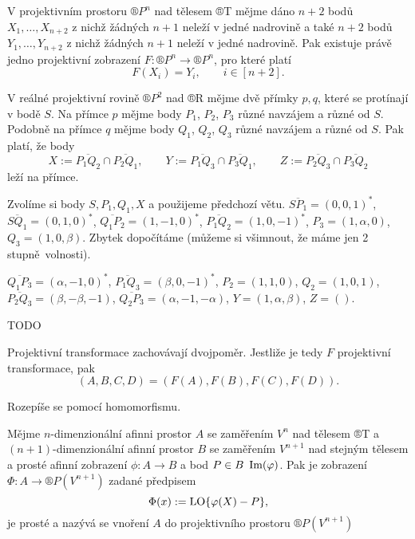 \documentclass[12pt]{article}					%
\begin{document}
\begin{dusledek}
	V projektivním prostoru $®P^n$ nad tělesem ®T mějme dáno $n+2$ bodů $X_1, …, X_{n+2}$ z nichž žádných $n+1$ neleží v jedné nadrovině a také $n+2$ bodů $Y_1, …, Y_{n+2}$ z nichž žádných $n+1$ neleží v jedné nadrovině. Pak existuje právě jedno projektivní zobrazení $F: ®P^n \rightarrow ®P^n$, pro které platí
	$$ F(X_i) = Y_i, \qquad i \in [n+2]. $$
\end{dusledek}

\begin{veta}
	V reálné projektivní rovině $®P^2$ nad ®R mějme dvě přímky $p, q$, které se protínají v bodě $S$. Na přímce $p$ mějme body $P_1$, $P_2$, $P_3$ různé navzájem a různé od $S$. Podobně na přímce $q$ mějme body $Q_1$, $Q_2$, $Q_3$ různé navzájem a různé od $S$. Pak platí, že body
	$$ X := \overline{P_1Q_2} \cap \overline{P_2Q_1}, \qquad Y := \overline{P_1Q_3} \cap \overline{P_3Q_1}, \qquad Z := \overline{P_2Q_3} \cap \overline{P_3Q_2} $$
	leží na přímce.

	\begin{dukazin}
		Zvolíme si body $S, P_1, Q_1, X$ a použijeme předchozí větu. $\overline{SP_1} = (0, 0, 1)^*$, $\overline{SQ_1} = (0, 1, 0)^*$, $\overline{Q_1P_2} = (1, -1, 0)^*$, $\overline{P_1Q_2} = (1, 0, -1)^*$, $P_3 = (1, \alpha, 0)$, $Q_3 = (1, 0, \beta)$. Zbytek dopočítáme (můžeme si všimnout, že máme jen 2 stupně volnosti).

		$\overline{Q_1P_3} = (\alpha, -1, 0)^*$, $\overline{P_1Q_3} = (\beta, 0, -1)^*$, $P_2 = (1, 1, 0)$, $Q_2 = (1, 0, 1)$, $\overline{P_2Q_3} = (\beta, -\beta, -1)$, $\overline{Q_2P_3} = (\alpha, -1, -\alpha)$, $Y = (1, \alpha, \beta)$, $Z = ()$.
	\end{dukazin}
\end{veta}

\begin{definice}[Dvojpoměr]
	TODO
\end{definice}

\begin{veta}
	Projektivní transformace zachovávají dvojpoměr. Jestliže je tedy $F$ projektivní transformace, pak
	$$ (A, B, C, D) = (F(A), F(B), F(C), F(D)). $$

	\begin{dukazin}
		Rozepíše se pomocí homomorfismu.
	\end{dukazin}
\end{veta}

\begin{definice}
	Mějme $n$-dimenzionální afinni prostor $A$ se zaměřením $V^n$ nad tělesem ®T a $(n+1)$-dimenzionální afinní prostor $B$ se zaměřením $V^{n+1}$ nad stejným tělesem a prosté afinní zobrazení $\phi: A \rightarrow B$ a bod $P \in B \ \operatorname{Im}(\varphi)$. Pak je zobrazení $\Phi: A \rightarrow ®P(V^{n+1})$ zadané předpisem
	$$ \Phi(x) := \operatorname{LO} \{\varphi(X) - P\}, $$
	je prosté a nazývá se vnoření $A$ do projektivního prostoru $®P(V^{n+1})$
\end{definice}
\end{document}
